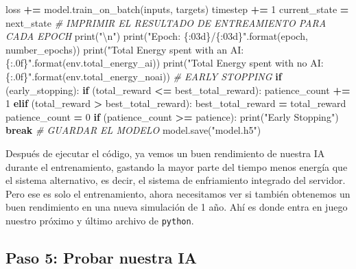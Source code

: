 \documentclass[
]{book}
\newenvironment{Shaded}{\begin{snugshade}}{\end{snugshade}}
\newcommand{\BuiltInTok}[1]{#1}
\newcommand{\CharTok}[1]{\textcolor[rgb]{0.31,0.60,0.02}{#1}}
\newcommand{\CommentTok}[1]{\textcolor[rgb]{0.56,0.35,0.01}{\textit{#1}}}
\newcommand{\ControlFlowTok}[1]{\textcolor[rgb]{0.13,0.29,0.53}{\textbf{#1}}}
\newcommand{\DecValTok}[1]{\textcolor[rgb]{0.00,0.00,0.81}{#1}}
\newcommand{\NormalTok}[1]{#1}
\newcommand{\OperatorTok}[1]{\textcolor[rgb]{0.81,0.36,0.00}{\textbf{#1}}}
\newcommand{\SpecialCharTok}[1]{\textcolor[rgb]{0.00,0.00,0.00}{#1}}
\newcommand{\StringTok}[1]{\textcolor[rgb]{0.31,0.60,0.02}{#1}}
\begin{document}
\begin{Shaded}
\begin{Highlighting}[]
\NormalTok{            loss }\OperatorTok{+=}\NormalTok{ model.train\_on\_batch(inputs, targets)}
\NormalTok{            timestep }\OperatorTok{+=} \DecValTok{1}
\NormalTok{            current\_state }\OperatorTok{=}\NormalTok{ next\_state}
        \CommentTok{\# IMPRIMIR EL RESULTADO DE ENTREAMIENTO PARA CADA EPOCH}
        \BuiltInTok{print}\NormalTok{(}\StringTok{"}\CharTok{\textbackslash{}n}\StringTok{"}\NormalTok{)}
        \BuiltInTok{print}\NormalTok{(}\StringTok{"Epoch: }\SpecialCharTok{\{:03d\}}\StringTok{/}\SpecialCharTok{\{:03d\}}\StringTok{"}\NormalTok{.}\BuiltInTok{format}\NormalTok{(epoch, number\_epochs))}
        \BuiltInTok{print}\NormalTok{(}\StringTok{"Total Energy spent with an AI: }\SpecialCharTok{\{:.0f\}}\StringTok{"}\NormalTok{.}\BuiltInTok{format}\NormalTok{(env.total\_energy\_ai))}
        \BuiltInTok{print}\NormalTok{(}\StringTok{"Total Energy spent with no AI: }\SpecialCharTok{\{:.0f\}}\StringTok{"}\NormalTok{.}\BuiltInTok{format}\NormalTok{(env.total\_energy\_noai))}
        \CommentTok{\# EARLY STOPPING}
        \ControlFlowTok{if}\NormalTok{ (early\_stopping):}
            \ControlFlowTok{if}\NormalTok{ (total\_reward }\OperatorTok{\textless{}=}\NormalTok{ best\_total\_reward):}
\NormalTok{                patience\_count }\OperatorTok{+=} \DecValTok{1}
            \ControlFlowTok{elif}\NormalTok{ (total\_reward }\OperatorTok{\textgreater{}}\NormalTok{ best\_total\_reward):}
\NormalTok{                best\_total\_reward }\OperatorTok{=}\NormalTok{ total\_reward}
\NormalTok{                patience\_count }\OperatorTok{=} \DecValTok{0}
            \ControlFlowTok{if}\NormalTok{ (patience\_count }\OperatorTok{\textgreater{}=}\NormalTok{ patience):}
                \BuiltInTok{print}\NormalTok{(}\StringTok{"Early Stopping"}\NormalTok{)}
                \ControlFlowTok{break}
        \CommentTok{\# GUARDAR EL MODELO}
\NormalTok{        model.save(}\StringTok{"model.h5"}\NormalTok{)}
\end{Highlighting}
\end{Shaded}

Después de ejecutar el código, ya vemos un buen rendimiento de nuestra IA durante el entrenamiento, gastando la mayor parte del tiempo menos energía que el sistema alternativo, es decir, el sistema de enfriamiento integrado del servidor. Pero ese es solo el entrenamiento, ahora necesitamos ver si también obtenemos un buen rendimiento en una nueva simulación de 1 año. Ahí es donde entra en juego nuestro próximo y último archivo de \texttt{python}.

\hypertarget{paso-5-probar-nuestra-ia}{%
\subsection{Paso 5: Probar nuestra IA}\label{paso-5-probar-nuestra-ia}}
\end{document}
